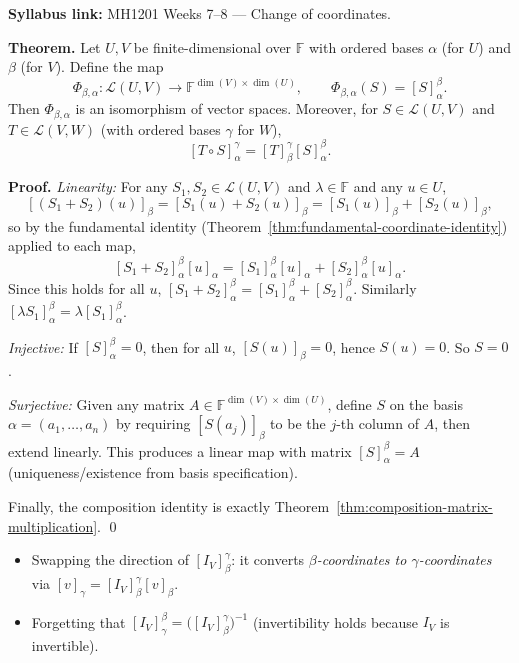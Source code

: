 \begin{extension}[title={Extension (Beyond Syllabus: the coordinate isomorphism $[\,\cdot\,]_\beta$ packages everything)}]
\textbf{Syllabus link:} MH1201 Weeks 7--8 — Change of coordinates.

\textbf{Theorem.} Let $U,V$ be finite-dimensional over $\mathbb{F}$ with ordered bases $\alpha$ (for $U$) and $\beta$ (for $V$).
Define the map
\[
\Phi_{\beta,\alpha}:\mathcal{L}(U,V)\to \mathbb{F}^{\dim(V)\times \dim(U)},\qquad
\Phi_{\beta,\alpha}(S)=[S]^{\beta}_{\alpha}.
\]
Then $\Phi_{\beta,\alpha}$ is an isomorphism of vector spaces. Moreover, for $S\in\mathcal{L}(U,V)$ and $T\in\mathcal{L}(V,W)$
(with ordered bases $\gamma$ for $W$),
\[
[T\circ S]^{\gamma}_{\alpha}=[T]^{\gamma}_{\beta}[S]^{\beta}_{\alpha}.
\]

\textbf{Proof.}
\emph{Linearity:} For any $S_1,S_2\in\mathcal{L}(U,V)$ and $\lambda\in\mathbb{F}$ and any $u\in U$,
\[
[(S_1+S_2)(u)]_\beta=[S_1(u)+S_2(u)]_\beta=[S_1(u)]_\beta+[S_2(u)]_\beta,
\]
so by the fundamental identity (Theorem~\ref{thm:fundamental-coordinate-identity}) applied to each map,
\[
[S_1+S_2]^{\beta}_{\alpha}[u]_\alpha=[S_1]^{\beta}_{\alpha}[u]_\alpha+[S_2]^{\beta}_{\alpha}[u]_\alpha.
\]
Since this holds for all $u$, $[S_1+S_2]^{\beta}_{\alpha}=[S_1]^{\beta}_{\alpha}+[S_2]^{\beta}_{\alpha}$.
Similarly $[\lambda S_1]^{\beta}_{\alpha}=\lambda [S_1]^{\beta}_{\alpha}$.

\emph{Injective:} If $[S]^{\beta}_{\alpha}=0$, then for all $u$, $[S(u)]_\beta=0$, hence $S(u)=0$. So $S=0$.

\emph{Surjective:} Given any matrix $A\in\mathbb{F}^{\dim(V)\times \dim(U)}$, define $S$ on the basis $\alpha=(a_1,\dots,a_n)$ by
requiring $[S(a_j)]_\beta$ to be the $j$-th column of $A$, then extend linearly.
This produces a linear map with matrix $[S]^{\beta}_{\alpha}=A$ (uniqueness/existence from basis specification).

Finally, the composition identity is exactly Theorem~\ref{thm:composition-matrix-multiplication}. \qed
\end{extension}

\begin{commonmistake}
\begin{itemize}
\item Swapping the direction of $[I_V]^{\gamma}_{\beta}$: it converts \emph{$\beta$-coordinates to $\gamma$-coordinates} via $[v]_\gamma=[I_V]^{\gamma}_{\beta}[v]_\beta$.
\item Forgetting that $[I_V]^{\beta}_{\gamma}=\bigl([I_V]^{\gamma}_{\beta}\bigr)^{-1}$ (invertibility holds because $I_V$ is invertible).
\end{itemize}
\end{commonmistake}

